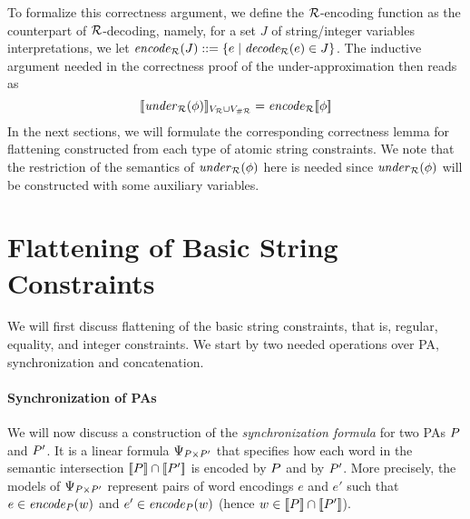 \documentclass[sigplan,review,anonymous]{acmart}\settopmatter{printfolios=true,printccs=false,printacmref=false}
\begin{document}
To formalize this correctness argument, we define the $\mathcal{R}$-encoding function as the counterpart of $\mathcal{R}$-decoding,  
%
namely, for a set $J$ of string/integer variables interpretations,  
we let $\mathit{encode}_{\mathcal{R}} (J) ::= \{e\mid \mathit{decode_{\mathcal{R}}} (e) \in J\}$.
%
%
%
%
The inductive argument needed in the correctness proof of the under-approximation then reads as
$$[\![\mathit{under}_{\mathcal{R}}(\phi)]\!]_{V_{\mathcal{R}}\cup V_{\#\mathcal{R}}}  = \mathit{encode}_{\mathcal{R}}{[\![\phi]\!]}$$ 
%
In the next sections, 
we will formulate the corresponding correctness lemma for flattening constructed from each type of atomic string constraints.
%
We note that the restriction of the semantics of $\mathit{under}_{\mathcal{R}}(\phi)$ here is needed since $\mathit{under}_{\mathcal{R}}(\phi)$ will be constructed with some auxiliary variables. 




\section{Flattening of Basic String Constraints}
\label{sec:flattening}
We will first discuss flattening of the basic string constraints, that is,
regular, equality, and integer constraints. We start by two needed operations over PA, synchronization and concatenation.

\paragraph{Synchronization of PAs}
We will now discuss a construction of the \emph{synchronization formula} for two PAs $P$ and $P'$. 
It is a linear formula $\Psi_{P \times P'}$ 
that specifies how each word in the semantic intersection $[\![P]\!] \cap [\![P']\!]$ is encoded by $P$ and by $P'$.
%
More precisely, the models of $\Psi_{P \times P'}$ represent pairs of word
encodings 
$e$ and $e'$ such that $e\in\mathit{encode}_{P}(w)$ and $e'\in\mathit{encode}_{P}(w)$ (hence $w\in[\![P]\!]\cap[\![P']\!]$).
\end{document}
